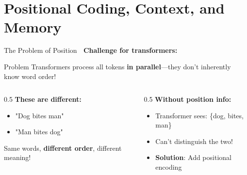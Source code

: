 \documentclass[aspectratio=169]{beamer}
\begin{document}
\section{Positional Coding, Context, and Memory}

\begin{frame}[shrink=10]{The Problem of Position 📍}
    \textbf{Challenge for transformers:}

    \vspace{0.3cm}

    \begin{alertblock}{Problem}
        Transformers process all tokens \textbf{in parallel}—they don't inherently know word order!
    \end{alertblock}

    \vspace{0.3cm}

    \begin{columns}[T]
        \begin{column}{0.5\textwidth}
            \textbf{These are different:}
            \begin{itemize}\setlength{\itemsep}{0pt}
                \item "Dog bites man"
                \item "Man bites dog"
            \end{itemize}

            Same words, \textbf{different order}, different meaning!
        \end{column}

        \begin{column}{0.5\textwidth}
            \textbf{Without position info:}
            \begin{itemize}\setlength{\itemsep}{0pt}
                \item Transformer sees: \{dog, bites, man\}
                \item Can't distinguish the two!
                \item \textbf{Solution}: Add positional encoding
            \end{itemize}
        \end{column}
    \end{columns}
\end{frame}
\end{document}
